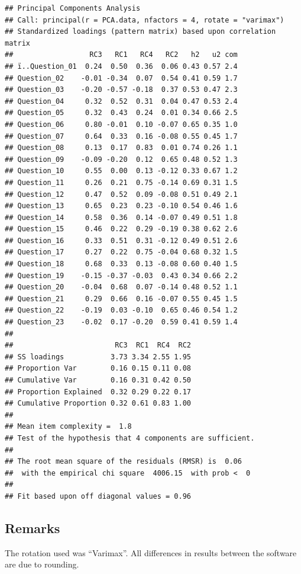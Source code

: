 \documentclass[
]{book}
\begin{document}
\begin{verbatim}
## Principal Components Analysis
## Call: principal(r = PCA.data, nfactors = 4, rotate = "varimax")
## Standardized loadings (pattern matrix) based upon correlation matrix
##                  RC3   RC1   RC4   RC2   h2   u2 com
## ï..Question_01  0.24  0.50  0.36  0.06 0.43 0.57 2.4
## Question_02    -0.01 -0.34  0.07  0.54 0.41 0.59 1.7
## Question_03    -0.20 -0.57 -0.18  0.37 0.53 0.47 2.3
## Question_04     0.32  0.52  0.31  0.04 0.47 0.53 2.4
## Question_05     0.32  0.43  0.24  0.01 0.34 0.66 2.5
## Question_06     0.80 -0.01  0.10 -0.07 0.65 0.35 1.0
## Question_07     0.64  0.33  0.16 -0.08 0.55 0.45 1.7
## Question_08     0.13  0.17  0.83  0.01 0.74 0.26 1.1
## Question_09    -0.09 -0.20  0.12  0.65 0.48 0.52 1.3
## Question_10     0.55  0.00  0.13 -0.12 0.33 0.67 1.2
## Question_11     0.26  0.21  0.75 -0.14 0.69 0.31 1.5
## Question_12     0.47  0.52  0.09 -0.08 0.51 0.49 2.1
## Question_13     0.65  0.23  0.23 -0.10 0.54 0.46 1.6
## Question_14     0.58  0.36  0.14 -0.07 0.49 0.51 1.8
## Question_15     0.46  0.22  0.29 -0.19 0.38 0.62 2.6
## Question_16     0.33  0.51  0.31 -0.12 0.49 0.51 2.6
## Question_17     0.27  0.22  0.75 -0.04 0.68 0.32 1.5
## Question_18     0.68  0.33  0.13 -0.08 0.60 0.40 1.5
## Question_19    -0.15 -0.37 -0.03  0.43 0.34 0.66 2.2
## Question_20    -0.04  0.68  0.07 -0.14 0.48 0.52 1.1
## Question_21     0.29  0.66  0.16 -0.07 0.55 0.45 1.5
## Question_22    -0.19  0.03 -0.10  0.65 0.46 0.54 1.2
## Question_23    -0.02  0.17 -0.20  0.59 0.41 0.59 1.4
## 
##                        RC3  RC1  RC4  RC2
## SS loadings           3.73 3.34 2.55 1.95
## Proportion Var        0.16 0.15 0.11 0.08
## Cumulative Var        0.16 0.31 0.42 0.50
## Proportion Explained  0.32 0.29 0.22 0.17
## Cumulative Proportion 0.32 0.61 0.83 1.00
## 
## Mean item complexity =  1.8
## Test of the hypothesis that 4 components are sufficient.
## 
## The root mean square of the residuals (RMSR) is  0.06 
##  with the empirical chi square  4006.15  with prob <  0 
## 
## Fit based upon off diagonal values = 0.96
\end{verbatim}

\hypertarget{remarks}{%
\subsection{Remarks}\label{remarks}}

The rotation used was ``Varimax''. All differences in results between the software are due to rounding.
\end{document}

